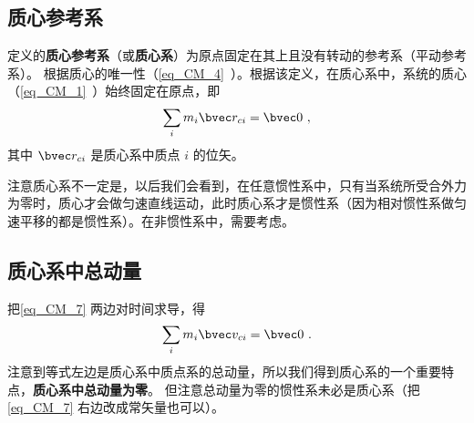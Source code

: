 

\subsection{质心参考系}\label{sub_CM_2}
定义的\textbf{质心参考系}（或\textbf{质心系}）为原点固定在其上且没有转动的参考系（平动参考系）。%
根据质心的唯一性（\autoref{eq_CM_4}~）。根据该定义，在质心系中，系统的质心（\autoref{eq_CM_1}~）始终固定在原点，即
\begin{equation}\label{eq_CM_7}
\sum_i m_i \bvec r_{ci} = \bvec 0~,
\end{equation}
其中 $\bvec r_{ci}$ 是质心系中质点 $i$ 的位矢。

注意质心系不一定是，以后我们会看到，在任意惯性系中，只有当系统所受合外力为零时，质心才会做匀速直线运动，此时质心系才是惯性系（因为相对惯性系做匀速平移的都是惯性系）。在非惯性系中，需要考虑。

\subsection{质心系中总动量}
把\autoref{eq_CM_7} 两边对时间求导，得
\begin{equation}\label{eq_CM_8}
\sum_i m_i \bvec v_{ci} = \bvec 0~.
\end{equation}
注意到等式左边是质心系中质点系的总动量，所以我们得到质心系的一个重要特点，\textbf{质心系中总动量为零}。 但注意总动量为零的惯性系未必是质心系（把\autoref{eq_CM_7} 右边改成常矢量也可以）。


